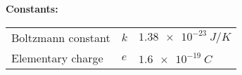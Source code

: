 \documentclass[../TST.tex]{subfiles}
\begin{document}
\ifprob 
\vspace*{2ex}
\textbf{Constants:}\\[5pt]
\begin{tabular}{@{}lll@{}}
Boltzmann constant & $k$ & $\qty{1.38e-23}{J/K}$ \\
Elementary charge & $e$  & $\qty{1.6e-19}{C}$  \\
\end{tabular}

\else
\fi
\end{document}
